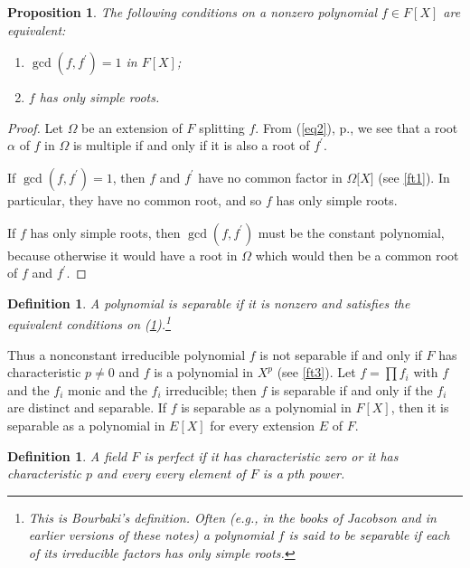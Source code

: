 \documentclass[a4paper,11pt,final,openany]{memoir}
\newtheorem{proposition}[X]{Proposition}
\newtheorem{definition}[X]{Definition}
\theoremstyle{nonumberplain}
\newtheorem{proof}{Proof.}
\begin{document}
\begin{proposition}
\label{ft3a}The following conditions on a nonzero polynomial $f\in F[X]$ are equivalent:

\begin{enumerate}
\item $\gcd(f,f^{\prime})=1$ in $F[X]$;

\item $f$ has only simple roots.
\end{enumerate}
\end{proposition}

\begin{proof}
Let $\Omega$ be an extension of $F$ splitting $f$. From (\ref{eq2}),
p.\thinspace\pageref{eq2}, we see that a root $\alpha$ of $f$ in $\Omega$ is
multiple if and only if it is also a root of $f^{\prime}$.

If $\gcd(f,f^{\prime})=1$, then $f$ and $f^{\prime}$ have no common factor in
$\Omega\lbrack X]$ (see \ref{ft1}). In particular, they have no common root,
and so $f$ has only simple roots.

If $f$ has only simple roots, then $\gcd(f,f^{\prime})$ must be the constant
polynomial, because otherwise it would have a root in $\Omega$ which would
then be a common root of $f$ and $f^{\prime}$.
\end{proof}

\begin{definition}
\label{ft4}A polynomial is
%
\emph{separable} if it is nonzero and satisfies the equivalent conditions on
(\ref{ft3a}).\footnote{This is Bourbaki's definition. Often (e.g., in the
books of Jacobson and in earlier versions of these notes) a polynomial $f$ is
said to be separable if each of its irreducible factors has only simple
roots.}
\end{definition}

Thus a nonconstant irreducible polynomial $f$ is not separable if and only if
$F$ has characteristic $p\neq0$ and $f$ is a polynomial in $X^{p}$ (see
\ref{ft3}). Let $f=\prod f_{i}$ with $f$ and the $f_{i}$ monic and the $f_{i}$
irreducible; then $f$ is separable if and only if the $f_{i}$ are distinct and
separable. If $f$ is separable as a polynomial in $F[X]$, then it is separable
as a polynomial in $E[X]$ for every extension $E$ of $F$.

\begin{definition}
\label{ft4m}A field $F$ is \emph{perfect\/}%
%
if it has characteristic zero or it has characteristic $p$ and every every
element of $F$ is a $p$th power.
\end{definition}
\end{document}
